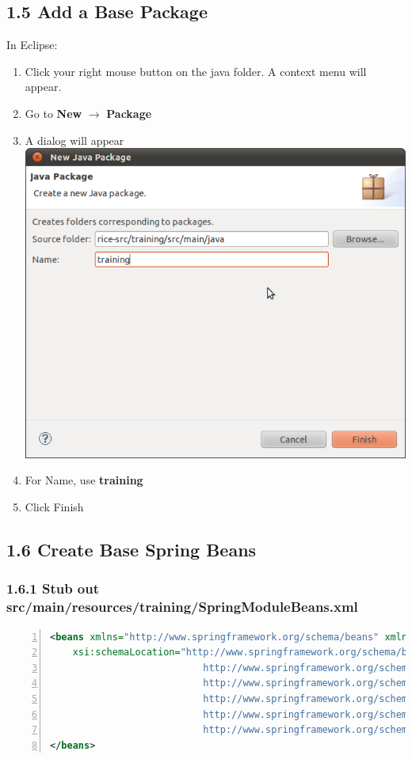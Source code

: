 \subsection*{1.5 Add a Base Package}
In Eclipse:
\begin{enumerate}
\item Click your right mouse button on the java folder. A context menu will appear.
\item Go to \textbf{New} $\rightarrow$ \textbf{Package}
\item A dialog will appear\\
  \includegraphics[width=\textwidth]{images/Screenshot9.png}
\item For Name, use \textbf{training}
\item Click Finish
\end{enumerate}

\subsection*{1.6 Create Base Spring Beans}
\subsubsection*{1.6.1 Stub out
  src/main/resources/training/SpringModuleBeans.xml}
\begin{lstlisting}[numbers=left,language=xml,basicstyle=\scriptsize,backgroundcolor=\color{ubergray},caption={Base
  SpringModuleBeans.xml},frame=single,breaklines=true]
<beans xmlns="http://www.springframework.org/schema/beans" xmlns:xsi="http://www.w3.org/2001/XMLSchema-instance" xmlns:aop="http://www.springframework.org/schema/aop" xmlns:tx="http://www.springframework.org/schema/tx"
	xsi:schemaLocation="http://www.springframework.org/schema/beans
                           http://www.springframework.org/schema/beans/spring-beans-2.0.xsd
                           http://www.springframework.org/schema/tx
                           http://www.springframework.org/schema/tx/spring-tx-2.0.xsd
                           http://www.springframework.org/schema/aop
                           http://www.springframework.org/schema/aop/spring-aop-2.0.xsd">
</beans>
\end{lstlisting}

